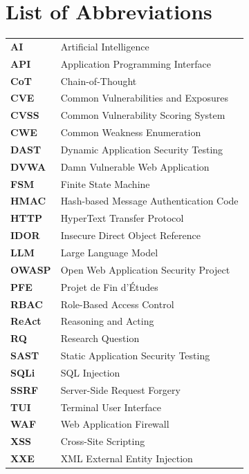 \documentclass[12pt, a4paper, oneside, openany]{book}
\begin{document}
\listoftables
{}
\cleardoublepage

\chapter*{List of Abbreviations}

\begin{tabular}{@{}p{2.2cm}@{}p{10cm}@{}}
\bfseries AI      & Artificial Intelligence \\
\bfseries API     & Application Programming Interface \\
\bfseries CoT     & Chain-of-Thought \\
\bfseries CVE     & Common Vulnerabilities and Exposures \\
\bfseries CVSS    & Common Vulnerability Scoring System \\
\bfseries CWE     & Common Weakness Enumeration \\
\bfseries DAST    & Dynamic Application Security Testing \\
\bfseries DVWA    & Damn Vulnerable Web Application \\
\bfseries FSM     & Finite State Machine \\
\bfseries HMAC    & Hash-based Message Authentication Code \\
\bfseries HTTP    & HyperText Transfer Protocol \\
\bfseries IDOR    & Insecure Direct Object Reference \\
\bfseries LLM     & Large Language Model \\
\bfseries OWASP   & Open Web Application Security Project \\
\bfseries PFE     & Projet de Fin d'\'{E}tudes \\
\bfseries RBAC    & Role-Based Access Control \\
\bfseries ReAct   & Reasoning and Acting \citep{yao2023react} \\
\bfseries RQ      & Research Question \\
\bfseries SAST    & Static Application Security Testing \\
\bfseries SQLi    & SQL Injection \\
\bfseries SSRF    & Server-Side Request Forgery \\
\bfseries TUI     & Terminal User Interface \\
\bfseries WAF     & Web Application Firewall \\
\bfseries XSS     & Cross-Site Scripting \\
\bfseries XXE     & XML External Entity Injection \\
\end{tabular}
\end{document}
